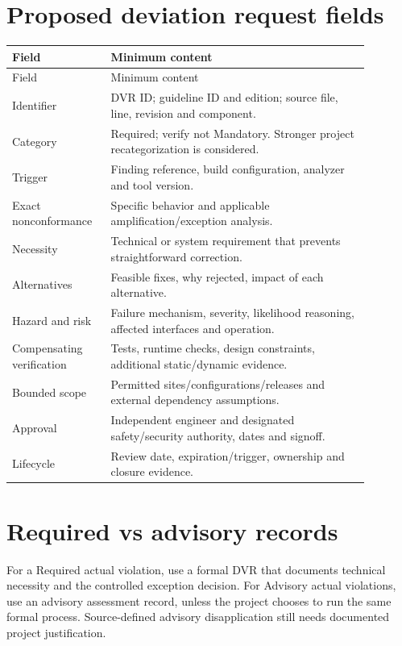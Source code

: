 \documentclass[10pt,letterpaper]{article}
\begin{document}
\section{Proposed deviation request fields}
\small\setlength{\tabcolsep}{3pt}\renewcommand{\arraystretch}{1.15}
\begin{longtable}{p{0.22\linewidth}p{0.66\linewidth}}
\toprule
Field & Minimum content\\ \midrule
\endfirsthead
\toprule
Field & Minimum content\\ \midrule
\endhead
Identifier & DVR ID; guideline ID and edition; source file, line, revision and component.\\
Category & Required; verify not Mandatory. Stronger project recategorization is considered.\\
Trigger & Finding reference, build configuration, analyzer and tool version.\\
Exact nonconformance & Specific behavior and applicable amplification/exception analysis.\\
Necessity & Technical or system requirement that prevents straightforward correction.\\
Alternatives & Feasible fixes, why rejected, impact of each alternative.\\
Hazard and risk & Failure mechanism, severity, likelihood reasoning, affected interfaces and operation.\\
Compensating verification & Tests, runtime checks, design constraints, additional static/dynamic evidence.\\
Bounded scope & Permitted sites/configurations/releases and external dependency assumptions.\\
Approval & Independent engineer and designated safety/security authority, dates and signoff.\\
Lifecycle & Review date, expiration/trigger, ownership and closure evidence.\\
\bottomrule
\end{longtable}
\normalsize

\section{Required vs advisory records}
For a Required actual violation, use a formal DVR that documents technical necessity and the controlled exception decision. For Advisory actual violations, use an advisory assessment record, unless the project chooses to run the same formal process. Source-defined advisory disapplication still needs documented project justification.
\end{document}
